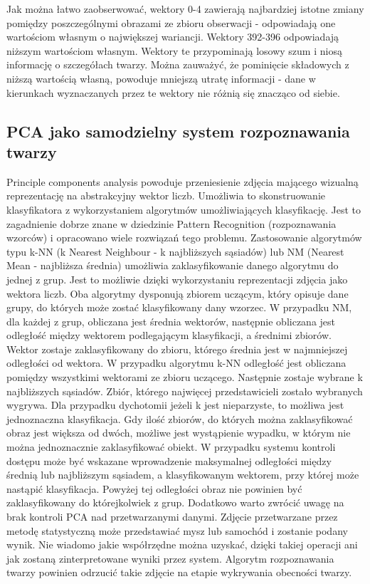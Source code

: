 \documentclass[oneside, eng]{mgr}
\begin{document}
Jak można łatwo zaobserwować, wektory 0-4 zawierają najbardziej istotne zmiany pomiędzy poszczególnymi obrazami ze zbioru obserwacji - odpowiadają one wartościom własnym o największej wariancji. Wektory 392-396 odpowiadają niższym wartościom własnym. Wektory te przypominają losowy szum i niosą informację o szczegółach twarzy. Można zauważyć, że pominięcie składowych z niższą wartością własną, powoduje mniejszą utratę informacji - dane w kierunkach wyznaczanych przez te wektory nie różnią się znacząco od siebie.

\subsection{PCA jako samodzielny system rozpoznawania twarzy}
Principle components analysis powoduje przeniesienie zdjęcia mającego wizualną reprezentację na abstrakcyjny wektor liczb. Umożliwia to skonstruowanie klasyfikatora z wykorzystaniem algorytmów umożliwiających klasyfikację. Jest to zagadnienie dobrze znane w dziedzinie Pattern Recognition (rozpoznawania wzorców) i opracowano wiele rozwiązań tego problemu. Zastosowanie algorytmów typu k-NN (k Nearest Neighbour - k najbliższych sąsiadów) lub NM (Nearest Mean - najbliższa średnia) umożliwia zaklasyfikowanie danego algorytmu do jednej z grup. Jest to możliwie dzięki wykorzystaniu reprezentacji zdjęcia jako wektora liczb. Oba algorytmy dysponują zbiorem uczącym, który opisuje dane grupy, do których może zostać klasyfikowany dany wzorzec. 
W przypadku NM, dla każdej z grup, obliczana jest średnia wektorów, następnie obliczana jest odległość między wektorem podlegającym klasyfikacji, a średnimi zbiorów. Wektor zostaje zaklasyfikowany do zbioru, którego średnia jest w najmniejszej odległości od wektora. 
W przypadku algorytmu k-NN odległość jest obliczana pomiędzy wszystkimi wektorami ze zbioru uczącego. Następnie zostaje wybrane k najbliższych sąsiadów. Zbiór, którego najwięcej przedstawicieli zostało wybranych wygrywa. Dla przypadku dychotomii jeżeli k jest nieparzyste, to możliwa jest jednoznaczna klasyfikacja. Gdy ilość zbiorów, do których można zaklasyfikować obraz jest większa od dwóch, możliwe jest wystąpienie wypadku, w którym nie można jednoznacznie zaklasyfikować obiekt. 
W przypadku systemu kontroli dostępu może być wskazane wprowadzenie maksymalnej odległości między średnią lub najbliższym sąsiadem, a klasyfikowanym wektorem, przy której może nastąpić klasyfikacja. Powyżej tej odległości obraz nie powinien być zaklasyfikowany do którejkolwiek z grup. 
Dodatkowo warto zwrócić uwagę na brak kontroli PCA nad przetwarzanymi danymi. Zdjęcie przetwarzane przez metodę statystyczną może przedstawiać mysz lub samochód i zostanie podany wynik. Nie wiadomo jakie współrzędne można uzyskać, dzięki takiej operacji ani jak zostaną zinterpretowane wyniki przez system. Algorytm rozpoznawania twarzy powinien odrzucić takie zdjęcie na etapie wykrywania obecności twarzy.
\end{document}

